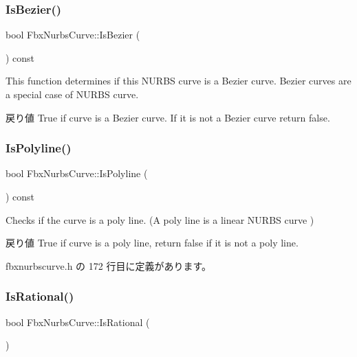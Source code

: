 \subsubsection{\texorpdfstring{Is\+Bezier()}{IsBezier()}}
{\footnotesize\ttfamily bool Fbx\+Nurbs\+Curve\+::\+Is\+Bezier (\begin{DoxyParamCaption}{ }\end{DoxyParamCaption}) const}

This function determines if this N\+U\+R\+BS curve is a Bezier curve. Bezier curves are a special case of N\+U\+R\+BS curve. \begin{DoxyReturn}{戻り値}
{\ttfamily True} if curve is a Bezier curve. If it is not a Bezier curve return {\ttfamily false}. 
\end{DoxyReturn}
\mbox{\label{class_fbx_nurbs_curve_a197e8df6c4d4e4773c485c0aec5ce593}} 
\subsubsection{\texorpdfstring{Is\+Polyline()}{IsPolyline()}}
{\footnotesize\ttfamily bool Fbx\+Nurbs\+Curve\+::\+Is\+Polyline (\begin{DoxyParamCaption}{ }\end{DoxyParamCaption}) const\hspace{0.3cm}{\ttfamily [inline]}}

Checks if the curve is a poly line. (A poly line is a linear N\+U\+R\+BS curve )

\begin{DoxyReturn}{戻り値}
{\ttfamily True} if curve is a poly line, return {\ttfamily false} if it is not a poly line. 
\end{DoxyReturn}


 fbxnurbscurve.\+h の 172 行目に定義があります。

\mbox{\label{class_fbx_nurbs_curve_a118714a2bcfd54a9e64b8cd2ed190f04}} 
\subsubsection{\texorpdfstring{Is\+Rational()}{IsRational()}}
{\footnotesize\ttfamily bool Fbx\+Nurbs\+Curve\+::\+Is\+Rational (\begin{DoxyParamCaption}{ }\end{DoxyParamCaption})}

